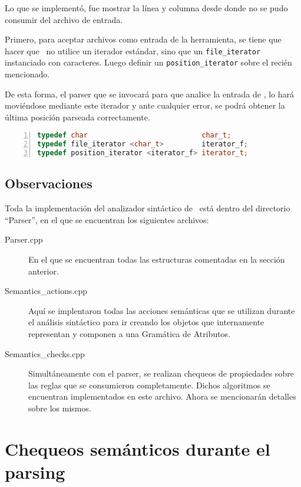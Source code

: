 Lo que se implementó, fue mostrar la línea y columna desde donde no se pudo consumir del archivo de entrada.

Primero, para aceptar archivos como entrada de la herramienta, se tiene que hacer que \spirit\ no utilice un iterador estándar, sino que un \texttt{file\_iterator} instanciado con caracteres. Luego definir un \texttt{position\_iterator} sobre el recién mencionado.

De esta forma, el parser que se invocará para que analice la entrada de \maggen, lo hará moviéndose mediante este iterador y ante cualquier error, se podrá obtener la última posición parseada correctamente.

\begin{lstlisting}[language=C++, basicstyle=\scriptsize, numbers=left, numbersep=5pt, numberstyle=\tiny]
typedef char                           char_t;
typedef file_iterator <char_t>         iterator_f;
typedef position_iterator <iterator_f> iterator_t;
\end{lstlisting}

\subsection{Observaciones}

Toda la implementación del analizador sintáctico de \maggen\ está dentro del directorio ``Parser'', en el que se encuentran los siguientes archivos:

\begin{description}
\item [Parser.cpp] En el que se encuentran todas las estructuras comentadas en la sección anterior.

\item [Semantics\_actions.cpp] Aquí se implentaron todas las acciones semánticas que se utilizan durante el análisis sintáctico para ir creando los objetos que internamente representan y componen a una Gramática de Atributos.

\item [Semantics\_checks.cpp] Simultáneamente con el parser, se realizan chequeos de propiedades sobre las reglas que se consumieron completamente. Dichos algoritmos se encuentran implementados en este archivo. Ahora se mencionarán detalles sobre los mismos.
\end{description}

\section{Chequeos semánticos durante el parsing}

